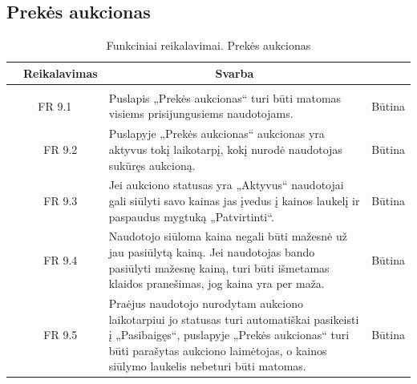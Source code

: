 \documentclass{VUMIFPSkursinis}
\begin{document}
	\subsection{Prekės aukcionas}
	\begin{table}[H]
		\caption{Funkciniai reikalavimai. Prekės aukcionas}
		\begin{tabular}{|p{1cm}|p{1cm}|p{}|p{}|}
			\hline 
			\rowcolor{gray!50}
			\multicolumn{2}{|c|}{{\bfseries Kodas}}&
			\multicolumn{1}{c|}{{\bfseries Reikalavimas}}&
			\multicolumn{1}{c|}{{\bfseries Svarba}}\\
			\hline
			\rowcolor{lightgray}
			\multicolumn{4}{|c|}{Prekės aukcionas}\\				
			\hline
			\multicolumn{2}{|c|}{FR 9.1}&
			{Puslapis „Prekės aukcionas“ turi būti matomas visiems prisijungusiems naudotojams.
			}&		
			\multicolumn{1}{c|}{Būtina}\\
			\hline
			\multicolumn{1}{|c}{}&
			\multicolumn{1}{c|}{FR 9.2}&
			{Puslapyje „Prekės aukcionas“ aukcionas yra aktyvus tokį laikotarpį, kokį nurodė naudotojas sukūręs aukcioną.
			}&		
			\multicolumn{1}{c|}{Būtina}\\
			\hline	
			\multicolumn{1}{|c}{}&
			\multicolumn{1}{c|}{FR 9.3}&
			{Jei aukciono statusas yra „Aktyvus“ naudotojai gali siūlyti savo kainas jas įvedus į kainos laukelį ir paspaudus mygtuką „Patvirtinti“.
			}&
			\multicolumn{1}{c|}{Būtina}\\									
			\hline
			\multicolumn{1}{|c}{}&
			\multicolumn{1}{c|}{FR 9.4}&
			{Naudotojo siūloma kaina negali būti mažesnė už jau pasiūlytą kainą. Jei naudotojas bando pasiūlyti mažesnę kainą, turi būti išmetamas klaidos pranešimas, jog kaina yra per maža.
			}&
			\multicolumn{1}{c|}{Būtina}\\									
			\hline
			\multicolumn{1}{|c}{}&
			\multicolumn{1}{c|}{FR 9.5}&
			{Praėjus naudotojo nurodytam aukciono laikotarpiui jo statusas turi automatiškai pasikeisti į „Pasibaigęs“, puslapyje „Prekės aukcionas“ turi būti parašytas aukciono laimėtojas, o kainos siūlymo laukelis nebeturi būti matomas.
			}&
			\multicolumn{1}{c|}{Būtina}\\									
			\hline
		\end{tabular}		
	\end{table}
	
\end{document}
